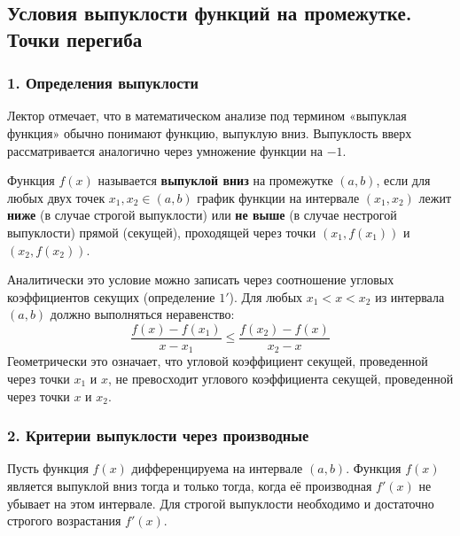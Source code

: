 \subsection{Условия выпуклости функций на промежутке. Точки перегиба}

\subsubsection*{1. Определения выпуклости}

Лектор отмечает, что в математическом анализе под термином «выпуклая функция» обычно понимают функцию, выпуклую вниз. Выпуклость вверх рассматривается аналогично через умножение функции на $-1$.

\begin{definition}
Функция $f(x)$ называется \textbf{выпуклой вниз} на промежутке $(a, b)$, если для любых двух точек $x_1, x_2 \in (a, b)$ график функции на интервале $(x_1, x_2)$ лежит \textbf{ниже} (в случае строгой выпуклости) или \textbf{не выше} (в случае нестрогой выпуклости) прямой (секущей), проходящей через точки $(x_1, f(x_1))$ и $(x_2, f(x_2))$.
\end{definition}

Аналитически это условие можно записать через соотношение угловых коэффициентов секущих (определение $1'$). Для любых $x_1 < x < x_2$ из интервала $(a, b)$ должно выполняться неравенство:
\[ \frac{f(x) - f(x_1)}{x - x_1} \le \frac{f(x_2) - f(x)}{x_2 - x} \]
Геометрически это означает, что угловой коэффициент секущей, проведенной через точки $x_1$ и $x$, не превосходит углового коэффициента секущей, проведенной через точки $x$ и $x_2$.

\subsubsection*{2. Критерии выпуклости через производные}

\begin{theorem}
Пусть функция $f(x)$ дифференцируема на интервале $(a, b)$. Функция $f(x)$ является выпуклой вниз тогда и только тогда, когда её производная $f'(x)$ не убывает на этом интервале. Для строгой выпуклости необходимо и достаточно строгого возрастания $f'(x)$.
\end{theorem}

